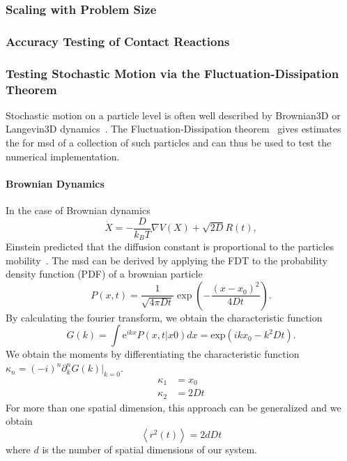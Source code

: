 \documentclass[a4paper]{article}
\begin{document}
\subsubsection{Scaling with Problem Size}
\subsubsection{Accuracy Testing of Contact Reactions}
\subsubsection{Testing Stochastic Motion via the Fluctuation-Dissipation Theorem}
Stochastic motion on a particle level is often well described by Brownian3D or Langevin3D
dynamics~\cite{Brown1828,Lemons1997}.
The Fluctuation-Dissipation theorem~\cite{Callen1951} gives estimates the for \ac{msd} of a
collection of such particles and can thus be used to test the numerical
implementation.

\paragraph{Brownian Dynamics}
In the case of Brownian dynamics~\cite{Brown1828}
\begin{equation}
    \dot{X} = -\frac{D}{k_B T} \nabla V(X) + \sqrt{2D}R(t),
\end{equation}
Einstein predicted that the diffusion constant is proportional to the particles
mobility~\cite{Einstein1905}.
The \ac{msd} can be derived by applying the FDT to the probability density function (PDF) of a
brownian particle
\begin{equation}
    P(x,t) = \frac{1}{\sqrt{4\pi D t}}\exp\left(-\frac{(x-x_0)^2}{4Dt}\right).
\end{equation}
By calculating the fourier transform, we obtain the characteristic function
\begin{equation}
    G(k) = \int \text{e}^{ikx} P(x,t|x0)dx = \text{exp}(ikx_0 - k^2Dt).
\end{equation}
We obtain the moments by differentiating the characteristic function
$\kappa_n = (-i)^n\partial_k^n G(k)|_{k=0}$.
\begin{align}
    \kappa_1 &= x_0\\
    \kappa_2 &= 2Dt
\end{align}
For more than one spatial dimension, this approach can be generalized and we obtain
\begin{equation}
    \left<r^2(t)\right> = 2d D t
\end{equation}
where $d$ is the number of spatial dimensions of our system.
\end{document}
